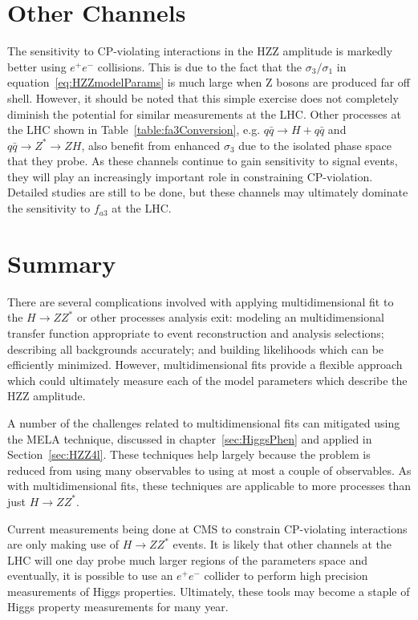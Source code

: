 \section{Other Channels}

The sensitivity to CP-violating interactions in the 
HZZ amplitude is markedly better using $e^+e^-$ collisions. 
This is due to the fact that the $\sigma_3/\sigma_1$ in 
equation~\ref{eq:HZZmodelParams} is much large when Z bosons
are produced far off shell.
However, it should be noted that this simple exercise does not
completely diminish the potential for similar measurements at 
the LHC.  Other processes at the LHC shown in
Table~\ref{table:fa3Conversion},
e.g. $q\bar{q}\to H + q\bar{q}$ and $q\bar{q}\to Z^* \to ZH$,
also benefit from enhanced $\sigma_3$
due to the isolated phase space that they probe.  As these channels 
continue to gain sensitivity to signal events, they will play an
increasingly important role in constraining CP-violation.
Detailed studies are still to be done, but these channels may
ultimately dominate the sensitivity to $f_{a3}$ at the LHC.  

\section{Summary}

There are several complications involved with applying
multidimensional fit to the $H\to ZZ^*$ or other processes
analysis exit:
modeling an multidimensional transfer function appropriate
to event reconstruction and analysis selections; describing all 
backgrounds accurately; and building likelihoods which can be
efficiently minimized. However, multidimensional fits provide
a flexible approach which
could ultimately measure each of the model parameters which 
describe the HZZ amplitude.  

A number of the challenges related to multidimensional fits
can mitigated using the MELA
technique, discussed in chapter~\ref{sec:HiggsPhen} and applied
in Section~\ref{sec:HZZ4l}.  These techniques
help largely because the problem is reduced from using
many observables to using at most a couple of observables.  As 
with multidimensional fits,
these techniques are applicable to more processes than just 
$H\to ZZ^*$.  

Current measurements being done at CMS to constrain 
CP-violating interactions are only making use of $H\to ZZ^*$
events.  It is
likely that other channels at the LHC will one day probe much
larger regions of the parameters space and eventually, it is 
possible to use an $e^+e^-$ collider to perform high precision
measurements of Higgs properties.  Ultimately, 
these tools may become a staple of Higgs property measurements
for many year.




